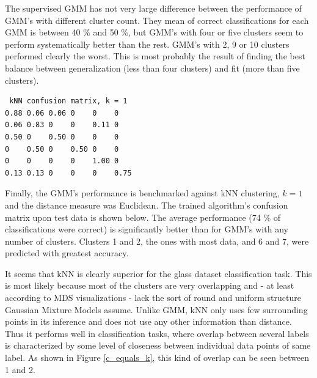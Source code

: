 \documentclass[a4paper]{article}
\begin{document}
\par
The supervised GMM has not very large difference between the performance of
GMM's with different cluster count. They mean of correct classifications for
each GMM is between 40 \% and 50 \%, but GMM's with four or five clusters seem
to perform systematically better than the rest. GMM's with 2, 9 or 10 clusters
performed clearly the worst. This is most probably the result of finding the
best balance between generalization (less than four clusters) and fit (more
than five clusters).

\begin{verbatim}
 kNN confusion matrix, k = 1
0.88 0.06 0.06 0    0    0   
0.06 0.83 0    0    0.11 0   
0.50 0    0.50 0    0    0   
0    0.50 0    0.50 0    0   
0    0    0    0    1.00 0   
0.13 0.13 0    0    0    0.75
\end{verbatim}

\par
Finally, the GMM's performance is benchmarked against kNN clustering, $ k = 1 $
and the distance measure was Euclidean. The trained algorithm's confusion
matrix upon test data is shown below. The average performance (74 \% of
classifications were correct) is significantly better than for GMM's with any
number of clusters. Clusters 1 and 2, the ones with most data, and 6 and 7,
were predicted with greatest accuracy. 

\par
It seems that kNN is clearly superior for the glass dataset classification task. This is most likely because most of the clusters are very overlapping and - at least according to MDS visualizations - lack the sort of round and uniform structure Gaussian Mixture Models assume. Unlike GMM, kNN only uses few surrounding points in its inference and does not use any other information than distance. Thus it performs well in classification tasks, where overlap between several labels is characterized by some level of closeness between individual data points of same label. As shown in Figure \ref{c_equals_k}, this kind of overlap can be seen between 1 and 2. 


\end{document}

